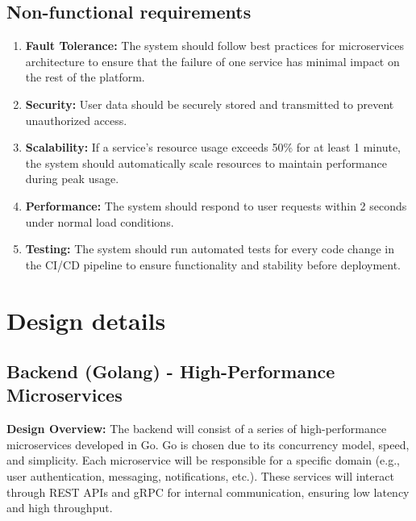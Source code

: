\documentclass[12pt]{report}
\begin{document}
\section{Non-functional requirements} 

\begin{enumerate}

  \item \textbf{Fault Tolerance:} The system should follow best practices for microservices architecture to ensure that the failure of one service has minimal impact on the rest of the platform.

   \item \textbf{Security:} User data should be securely stored and transmitted to prevent unauthorized access. 

\item \textbf{Scalability:} If a service's resource usage exceeds 50\% for at least 1 minute, the system should automatically scale resources to maintain performance during peak usage.

\item \textbf{Performance:} The system should respond to user requests within 2 seconds under normal load conditions.

\item \textbf{Testing:} The system should run automated tests for every code change in the CI/CD pipeline to ensure functionality and stability before deployment.

\end{enumerate}

\chapter{Design details} 

\section{Backend (Golang) - High-Performance Microservices}

\textbf{Design Overview:} The backend will consist of a series of high-performance microservices developed in Go. Go is chosen due to its concurrency model, speed, and simplicity. Each microservice will be responsible for a specific domain (e.g., user authentication, messaging, notifications, etc.). These services will interact through REST APIs and gRPC for internal communication, ensuring low latency and high throughput.
\end{document}
